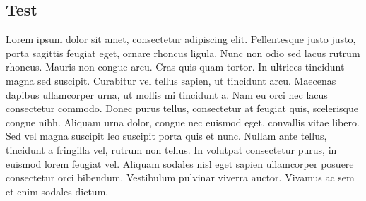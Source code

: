 \documentclass[letterpaper, twoside, 12pt, memoire, creativecommons, hyperref]{thETS}
\begin{document}
\subsection{Test}


Lorem ipsum dolor sit amet, consectetur adipiscing elit. Pellentesque justo justo, porta sagittis feugiat eget, ornare rhoncus ligula. Nunc non odio sed lacus rutrum rhoncus. Mauris non congue arcu. Cras quis quam tortor. In ultrices tincidunt magna sed suscipit. Curabitur vel tellus sapien, ut tincidunt arcu. Maecenas dapibus ullamcorper urna, ut mollis mi tincidunt a. Nam eu orci nec lacus consectetur commodo. Donec purus tellus, consectetur at feugiat quis, scelerisque congue nibh. Aliquam urna dolor, congue nec euismod eget, convallis vitae libero. Sed vel magna suscipit leo suscipit porta quis et nunc. Nullam ante tellus, tincidunt a fringilla vel, rutrum non tellus. In volutpat consectetur purus, in euismod lorem feugiat vel. Aliquam sodales nisl eget sapien ullamcorper posuere consectetur orci bibendum. Vestibulum pulvinar viverra auctor. Vivamus ac sem et enim sodales dictum.

 


%


\singlespacing
\onehalfspacing



\newpage
\singlespacing

\onehalfspacing
\end{document}
